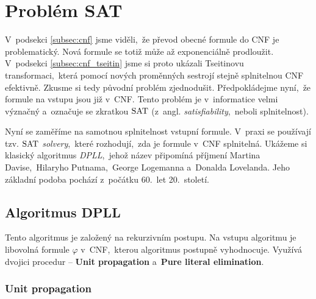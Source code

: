 \section{Problém SAT}\label{sec:sat}

V~podsekci \ref{subsec:cnf} jsme viděli,~že převod obecné formule do CNF  je problematický. Nová formule se totiž může až exponenciálně prodloužit. V~podsekci \ref{subsec:cnf_tseitin} jsme si proto ukázali Tseitinovu transformaci,~která pomocí nových proměnných sestrojí stejně splnitelnou CNF efektivně. Zkusme si tedy původní problém zjednodušit. Předpokládejme nyní,~že formule na vstupu jsou již v~CNF. Tento problém je v~informatice velmi význačný a~označuje se zkratkou \ensuremath{\SAT} (z~angl. \emph{satisfiability},~neboli splnitelnost).


Nyní se zaměříme na samotnou splnitelnost vstupní formule. V~praxi se používají tzv. \emph{\ensuremath{\SAT} solvery},~které rozhodují,~zda je formule v~CNF splnitelná. Ukážeme si klasický algoritmus \emph{DPLL},~jehož název připomíná příjmení Martina Davise,~Hilaryho Putnama,~George Logemanna a~Donalda Lovelanda. Jeho základní podoba pochází z~počátku 60.~let 20.~století.

\subsection{Algoritmus DPLL}\label{subsec:dpll}

Tento algoritmus je založený na rekurzivním postupu. Na vstupu algoritmu je libovolná formule $\varphi$ v~CNF,~kterou algoritmus postupně vyhodnocuje. Využívá dvojici procedur -- \textbf{Unit propagation} a~\textbf{Pure literal elimination}.

\subsubsection*{Unit propagation}

